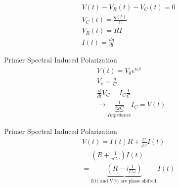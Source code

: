 \begin{frame}
\begin{eqnarray*}
  V(t) - V_R(t) - V_C(t) = 0 \\
  V_C(t) = \frac{q(t)}{C} \\ 
  V_R(t) = RI \\
  I(t) = \frac{dq}{dt}
 \end{eqnarray*}
\end{frame}

\begin{frame}{Primer Spectral Induced Polarization}
  \begin{eqnarray}
    &V(t) = V_0e^{i\omega t} \\
    &V_c = \frac{q}{C} \\
    &\frac{d}{dt}V_C = I_C \frac{1}{C} \\
    &\rightarrow \underbrace{\frac{1}{i\omega C}}_{Impedance} I_C =  V(t)
  \end{eqnarray}
\end{frame}



\begin{frame}{Primer Spectral Induced Polarization}
  \begin{eqnarray}
    V(t) = I(t)R + \frac{C}{j\omega}I(t) \\
         = (R + \frac{1}{iC\omega})I(t) \\
         = \underbrace{(R - i\frac{1}{C\omega})}_{\text{I(t) and V(t) are phase shifted.}}I(t)
  \end{eqnarray}
\end{frame}